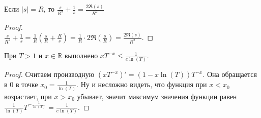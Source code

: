 \begin{lemma} \label{l5_lm14}
	Если $|s| = R$, то $\displaystyle \frac{s}{R^2} + \frac{1}{s} = \frac{2 \Re(s)}{R^2}$
\end{lemma}
\begin{proof}~\\
    $\displaystyle \frac{s}{R^2} + \frac{1}{s} = \frac{1}{R} \left( \frac{s}{R} + \frac{R}{s} \right) = \frac{1}{R} \cdot 2 \Re\left(\frac{s}{R}\right) = \frac{2 \Re(s)}{R^2}$.
\end{proof} 

\begin{lemma} \label{l5_lm15}
    При $T > 1$ и $x \in \mathbb{R}$ выполнено $x T^{-x} \leq \frac{1}{e \ln(T)}$.
\end{lemma}
\begin{proof}
	Считаем производную $\displaystyle (x T^{-x})' = (1 - x \ln(T))T^{-x}$.  Она обращается в $0$ в точке $\displaystyle x_0 = \frac{1}{\ln(T)}$. Ну и несложно видеть, что функция при $x < x_0$ возрастает, при $x > x_0$ убывает, значит максимум значения функции равен $\displaystyle \frac{1}{\ln (T)} T^{-\frac{1}{\ln(T)}} = \frac{1}{e \ln(T)}$.
\end{proof}

